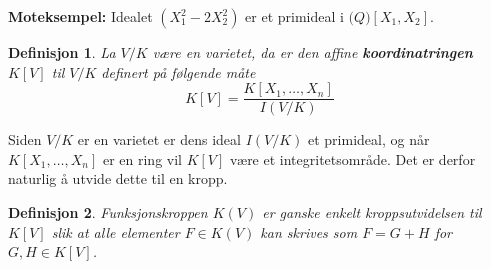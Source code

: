 \documentclass{article}
\newtheorem{definisjon}{Definisjon}[section]
\begin{document}
\textbf{Moteksempel:} Idealet $(X_1^2 - 2X_2^2)$ er et primideal i $\mathcal(Q)[X_1, X_2]$.
\begin{definisjon}
La $V/K$ være en varietet, da er den affine \textbf{koordinatringen} $K[V]$ til $V/K$ definert på følgende måte
\begin{equation*}
    K[V] = \frac{K[X_1, \ldots, X_n]}{I(V/K)}
\end{equation*}
\end{definisjon}
Siden $V/K$ er en varietet er dens ideal $I(V/K)$ et primideal, og når $K[X_1, \ldots, X_n]$ er en ring vil $K[V]$ være et integritetsområde. Det er derfor naturlig å utvide dette til en kropp.
\begin{definisjon}
Funksjonskroppen $K(V)$ er ganske enkelt kroppsutvidelsen til $K[V]$ slik at alle elementer $F \in K(V)$ kan skrives som $F = G + H$ for $G, H \in K[V]$.
\end{definisjon}
\end{document}
